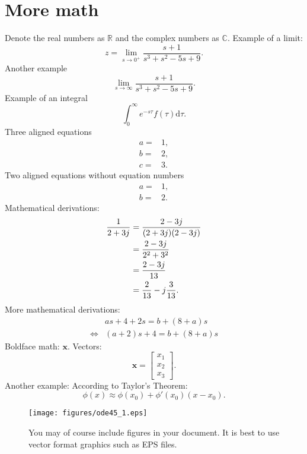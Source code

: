 \documentclass[a4paper,10pt,reqno]{amsart}
\numberwithin{equation}{section}
\newcommand{\R}{\mathbb{R}}
\newcommand{\C}{\mathbb{C}}
\newcommand{\dd}{\mathrm{d}}
\begin{document}
\section{More math} Denote the real numbers as $\R$ and the complex numbers as $\C$. Example of a limit:
  \begin{equation}
    z = \lim_{s\to0^+}\frac{s+1}{s^3+s^2-5s+9}.
  \end{equation}
  Another example
  \begin{equation}
    \lim_{s\to\infty} \frac{s+1}{s^3+s^2-5s+9}.
  \end{equation}
  Example of an integral
  \begin{equation}
    \int_0^\infty e^{-s\tau}f(\tau)\dd\tau.
  \end{equation}
    Three aligned equations
  \begin{align}
    a =& 1,
    \\
    b =& 2,
    \\
    c =& 3.
  \end{align}
  Two aligned equations without equation numbers
  \begin{align*}
    a =& 1,
    \\
    b =& 2.
  \end{align*}
  Mathematical derivations:
  \begin{align}
    \frac{1}{2+3j} {}={}& \frac{2-3j}{(2+3j)(2-3j)}
    \notag\\
    {}={}& \frac{2-3j}{2^2 + 3^2}
    \notag\\
    {}={}& \frac{2-3j}{13}
    \notag\\
    {}={}&\frac{2}{13} - j\frac{3}{13}.
  \end{align}
  More mathematical derivations:
  \begin{align*}
    & as + 4 + 2s = b + (8+a)s
    \\
    \Leftrightarrow{}& (a+2)s + 4 = b + (8+a)s
  \end{align*}
  Boldface math: $\bm{x}$. Vectors:
  \begin{equation}
    \bm{x} =
    \begin{bmatrix}
      x_1
      \\
      x_2
      \\
      x_3
      \end{bmatrix}.
  \end{equation}
  Another example: According to Taylor's Theorem:
  \begin{equation}
    \phi(x) \approx \phi(x_0) + \phi'(x_0)(x-x_0).
  \end{equation}


    \begin{figure}
      \centering
      \texttt{[image: figures/ode45\_1.eps]}
      \caption{You may of course include figures in your document. It is best to use vector format graphics such as EPS files.}
    \end{figure}
\end{document}
